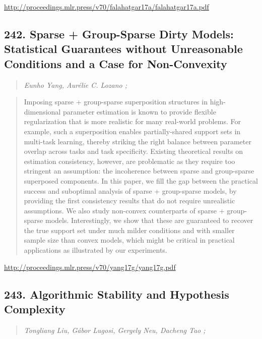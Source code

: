 \documentclass{article}
\begin{document}
\href{http://proceedings.mlr.press/v70/falahatgar17a/falahatgar17a.pdf}{http://proceedings.mlr.press/v70/falahatgar17a/falahatgar17a.pdf}

\subsection{242. Sparse + Group-Sparse Dirty Models: Statistical Guarantees without Unreasonable Conditions and a Case for Non-Convexity}

\begin{quote}
\footnotesize{\textit{Eunho Yang, Aurélie C. Lozano ;}}
\end{quote}

\begin{quote}
    Imposing sparse + group-sparse superposition structures in high-dimensional parameter estimation is known to provide flexible regularization that is more realistic for many real-world problems. For example, such a superposition enables partially-shared support sets in multi-task learning, thereby striking the right balance between parameter overlap across tasks and task specificity. Existing theoretical results on estimation consistency, however, are problematic as they require too stringent an assumption: the incoherence between sparse and group-sparse superposed components. In this paper, we fill the gap between the practical success and suboptimal analysis of sparse + group-sparse models, by providing the first consistency results that do not require unrealistic assumptions. We also study non-convex counterparts of sparse + group-sparse models. Interestingly, we show that these are guaranteed to recover the true support set under much milder conditions and with smaller sample size than convex models, which might be critical in practical applications as illustrated by our experiments.  \end{quote}

\href{http://proceedings.mlr.press/v70/yang17g/yang17g.pdf}{http://proceedings.mlr.press/v70/yang17g/yang17g.pdf}

\subsection{243. Algorithmic Stability and Hypothesis Complexity}

\begin{quote}
\footnotesize{\textit{Tongliang Liu, Gábor Lugosi, Gergely Neu, Dacheng Tao ;}}
\end{quote}
\end{document}
